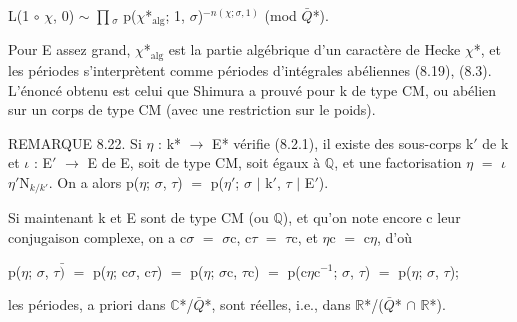 \documentclass[10pt,twoside]{article}
\begin{document}
L(1 \ensuremath{∘} \ensuremath{χ}, 0) \ensuremath{∼} \ensuremath{∏}\ensuremath{_{σ}} p(\ensuremath{χ}*\ensuremath{_{\mathrm{alg}}}; 1, \ensuremath{σ})\ensuremath{^{−n(χ;σ,1)}}    (mod \ensuremath{\bar{Q}}*).\par
Pour E assez grand, \ensuremath{χ}*\ensuremath{_{\mathrm{alg}}} est la partie algébrique d’un caractère de Hecke \ensuremath{χ}*, et les périodes s’interprètent comme périodes d’intégrales abéliennes (8.19), (8.3). L’énoncé obtenu est celui que Shimura a prouvé pour k de type CM, ou abélien sur un corps de type CM (avec une restriction sur le poids).\par
REMARQUE 8.22. Si \ensuremath{η} : k* \ensuremath{→} E* vérifie (8.2.1), il existe des sous-corps k\ensuremath{′} de k et \ensuremath{ι} : E\ensuremath{′} \ensuremath{→} E de E, soit de type CM, soit égaux à \ensuremath{ℚ}, et une factorisation \ensuremath{η} \ensuremath{=} \ensuremath{ι}\ensuremath{η}\ensuremath{′}N\ensuremath{_{k/k′}}. On a alors p(\ensuremath{η}; \ensuremath{σ}, \ensuremath{τ}) \ensuremath{=} p(\ensuremath{η}\ensuremath{′}; \ensuremath{σ} \ensuremath{|} k\ensuremath{′}, \ensuremath{τ} \ensuremath{|} E\ensuremath{′}).\par
Si maintenant k et E sont de type CM (ou \ensuremath{ℚ}), et qu’on note encore c leur conjugaison complexe, on a c\ensuremath{σ} \ensuremath{=} \ensuremath{σ}c, c\ensuremath{τ} \ensuremath{=} \ensuremath{τ}c, et \ensuremath{η}c \ensuremath{=} c\ensuremath{η}, d’où\par
p(\ensuremath{η}; \ensuremath{σ}, \ensuremath{τ}\ensuremath{\bar{)}} \ensuremath{=} p(\ensuremath{η}; c\ensuremath{σ}, c\ensuremath{τ}) \ensuremath{=} p(\ensuremath{η}; \ensuremath{σ}c, \ensuremath{τ}c) \ensuremath{=} p(c\ensuremath{η}c\ensuremath{^{-1}}; \ensuremath{σ}, \ensuremath{τ}) \ensuremath{=} p(\ensuremath{η}; \ensuremath{σ}, \ensuremath{τ});\par
les périodes, a priori dans \ensuremath{ℂ}*/\ensuremath{\bar{Q}}*, sont réelles, i.e., dans \ensuremath{ℝ}*/(\ensuremath{\bar{Q}}* \ensuremath{∩} \ensuremath{ℝ}*).\par
\end{document}
